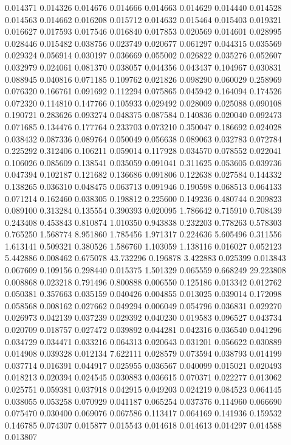 0.014371
0.014326
0.014676
0.014666
0.014663
0.014629
0.014440
0.014528
0.014563
0.014662
0.016208
0.015712
0.014632
0.015464
0.015403
0.019321
0.016627
0.017593
0.017546
0.016840
0.017853
0.020569
0.014601
0.028995
0.028446
0.015482
0.038756
0.023749
0.020677
0.061297
0.044315
0.035569
0.029324
0.056914
0.030197
0.036669
0.055002
0.026822
0.035276
0.052607
0.032979
0.024061
0.081370
0.038057
0.044356
0.043437
0.104967
0.030831
0.088945
0.040816
0.071185
0.109762
0.021826
0.098290
0.060029
0.258969
0.076320
0.166761
0.091692
0.112294
0.075865
0.045942
0.164094
0.174526
0.072320
0.114810
0.147766
0.105933
0.029492
0.028009
0.025088
0.090108
0.190721
0.283626
0.093274
0.048375
0.087584
0.140836
0.020040
0.092473
0.071685
0.134476
0.177764
0.233703
0.073210
0.350047
0.186692
0.024028
0.038432
0.087336
0.089764
0.050049
0.056638
0.089063
0.032783
0.072784
0.225292
0.312406
0.106211
0.059014
0.117928
0.034570
0.078552
0.022041
0.106026
0.085609
0.138541
0.035059
0.091041
0.311625
0.053605
0.039736
0.047394
0.102187
0.121682
0.136686
0.091806
0.122638
0.027584
0.144332
0.138265
0.036310
0.048475
0.063713
0.091946
0.190598
0.068513
0.064133
0.071214
0.162460
0.038305
0.198812
0.225600
0.149236
0.480744
0.209823
0.089100
0.313284
0.135554
0.390393
0.020095
1.786642
0.715910
0.708439
0.243408
0.453843
0.810874
1.010350
0.943838
0.232203
0.778263
0.578303
0.765250
1.568774
8.951860
1.785456
1.971317
0.224636
5.605496
0.311556
1.613141
0.509321
0.380526
1.586760
1.103059
1.138116
0.016027
0.052123
5.442886
0.008462
0.675078
43.732296
0.196878
3.422883
0.025399
0.013843
0.067609
0.109156
0.298440
0.015375
1.501329
0.065559
0.668249
29.223808
0.008868
0.023218
0.791496
0.800888
0.006550
0.125186
0.013342
0.012762
0.050381
0.357663
0.035159
0.040426
0.004855
0.013025
0.039014
0.172098
0.058568
0.008162
0.027662
0.049294
0.006049
0.054796
0.036831
0.029270
0.026973
0.042139
0.037239
0.029392
0.040230
0.019583
0.096527
0.043734
0.020709
0.018757
0.027472
0.039892
0.044281
0.042316
0.036540
0.041296
0.034729
0.034471
0.033216
0.064313
0.020643
0.031201
0.056622
0.030889
0.014908
0.039328
0.012134
7.622111
0.028579
0.073594
0.038793
0.014199
0.037714
0.016391
0.044917
0.025955
0.036567
0.040099
0.015021
0.020493
0.018213
0.020394
0.024545
0.030883
0.036615
0.070371
0.022277
0.013062
0.025751
0.059381
0.037918
0.042915
0.049203
0.024219
0.084523
0.064145
0.038055
0.053258
0.070929
0.041187
0.065254
0.037376
0.114960
0.066690
0.075470
0.030400
0.069076
0.067586
0.113417
0.064169
0.141936
0.159532
0.146785
0.074307
0.015877
0.015543
0.014618
0.014613
0.014297
0.014588
0.013807
